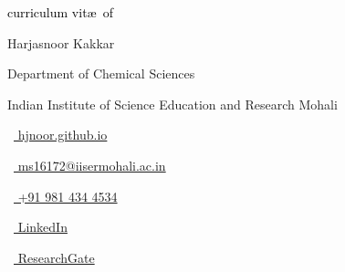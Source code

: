 \begin{scriptsize}
	 \textcolor{black}{curriculum vit\ae~of}
\end{scriptsize}

\vspace*{-0.10em}
\begin{Large} 
	Harjasnoor Kakkar
\end{Large}

\vspace*{0.25em}
\begin{scshape}
	\begin{footnotesize}
		  \textcolor{highlight2}{Department of Chemical Sciences }
		  
		  \vspace*{-1ex}
		  \textcolor{highlight2}{Indian Institute of Science Education and Research Mohali}
	\end{footnotesize}
\end{scshape}
\vspace*{0.4cm}

\begin{footnotesize}
	\begin{tiny}\faHome\end{tiny}~\href{https://hjnoor.github.io/}{
		hjnoor.github.io
	}
	\quad \begin{tiny}\faEnvelope[regular]\end{tiny}~\href{mailto:ms16172@iisermohali.ac.in}{%
		ms16172@iisermohali.ac.in
	} 
	
	\begin{tiny}\faMobile*\end{tiny}~\href{tel:+91 981 434 4534  }{
		+91 981 434 4534 
	} 
	\quad 
	\begin{tiny}\faLinkedinIn\end{tiny}~\href{https://www.linkedin.com/in/harjasnoor-kakkar-297426200/}{
		LinkedIn
	}
	\quad 
	\begin{tiny}\faGraduationCap\end{tiny}~\href{https://www.researchgate.net/profile/Harjasnoor_Kakkar}{
		 ResearchGate
		}

\end{footnotesize}